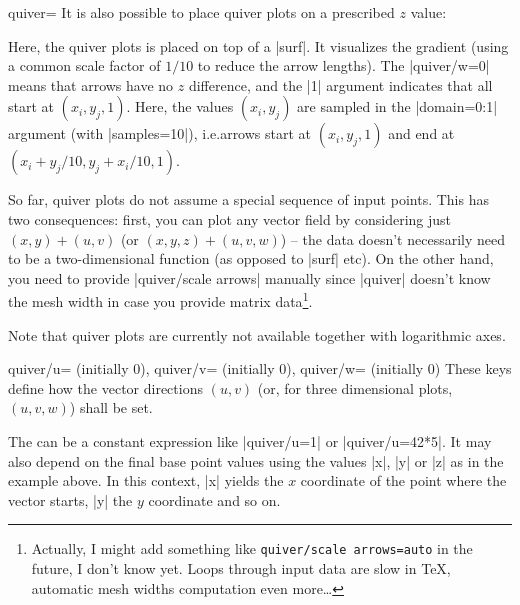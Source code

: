 {\begin{plottype}[/pgfplots]{quiver=%
    \textcolor{black}{}%
}
    It is also possible to place quiver plots on a prescribed $z$ value:
\pgfplotsexpensiveexample
\begin{codeexample}[]
\end{codeexample}
    \noindent Here, the quiver plots is placed on top of a |surf|. It
    visualizes the gradient (using a common scale factor of $1/10$ to reduce
    the arrow lengths). The |quiver/w=0| means that arrows have no $z$
    difference, and the |{1}| argument indicates that all start at
    $(x_i,y_j,1)$. Here, the values $(x_i,y_j)$ are sampled in the |domain=0:1|
    argument (with |samples=10|), i.e.\@ arrows start at $(x_i,y_j,1)$ and end
    at $(x_i+y_j/10, y_j+x_i/10, 1)$.

    So far, quiver plots do not assume a special sequence of input points. This
    has two consequences: first, you can plot any vector field by considering
    just $(x,y) + (u,v)$ (or $(x,y,z) + (u,v,w)$) -- the data doesn't
    necessarily need to be a two-dimensional function (as opposed to |surf|
    etc). On the other hand, you need to provide |quiver/scale arrows| manually
    since |quiver| doesn't know the mesh width in case you provide matrix
    data\footnote{Actually, I might add something like \texttt{quiver/scale
    arrows=auto} in the future, I don't know yet. Loops through input data are
    slow in \TeX{}, automatic mesh widths computation even more\ldots}.

    Note that quiver plots are currently not available together with
    logarithmic axes.

    \begin{pgfplotskeylist}{%
        quiver/u= (initially 0),
        quiver/v= (initially 0),
        quiver/w= (initially 0)%
    }
        These keys define how the vector directions $(u,v)$ (or, for three
        dimensional plots, $(u,v,w)$) shall be set.

        The  can be a constant expression like |quiver/u=1| or
        |quiver/u=42*5|. It may also depend on the final base point values
        using the values |x|, |y| or |z| as in the example above. In this
        context, |x| yields the $x$ coordinate of the point where the vector
        starts, |y| the $y$ coordinate and so on.



\end{pgfplotskeylist}
\end{plottype}}
